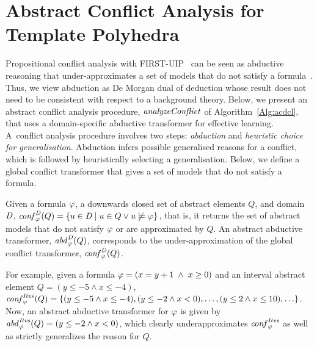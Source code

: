 \section{Abstract Conflict Analysis for Template Polyhedra}\label{sec:conflict}

Propositional conflict analysis with FIRST-UIP~\cite{cdcl} can be seen as
abductive reasoning that under-approximates a set of models that do not
satisfy a formula~\cite{sas12,dhk2013-popl}.  Thus, we view abduction as 
De Morgan dual of deduction whose result does not need to be consistent with respect
to a background theory.  Below, we present an abstract
conflict analysis procedure, $\mathit{analyzeConflict}$ of
Algorithm~\ref{Alg:acdcl}, that uses a domain-specific abductive transformer
for effective learning.  A~conflict analysis procedure involves two steps:
{\em abduction} and {\em heuristic choice for generalisation}.  Abduction
infers possible generalised reasons for a conflict, which is followed by
heuristically selecting a generalisation.  Below, we define a global 
conflict transformer that gives a set of models that do not satisfy a 
formula.
%
\begin{definition}
  Given a formula $\varphi$, a downwards closed set of abstract elements $Q$,
  and domain $\mathit{D}$, $\mathit{conf}_{\varphi}^{\mathit{D}}(Q) = \{u \in \mathit{D} \mid u \in
  Q \vee u \not\models \varphi \}$, that is, it returns 
  the set of abstract models that do not satisfy $\varphi$ or are approximated by 
  $Q$.  An abstract abductive transformer, $\mathit{abd}_{\varphi}^{\mathit{D}}(Q)$, corresponds to 
  the under-approximation of the global conflict transformer,
  $\mathit{conf}_{\varphi}^{\mathit{D}}(Q)$.  
\end{definition}
%
%
For example, given a formula $\varphi=(x=y+1\; \wedge\; x\geq 0)$ and an interval 
abstract element $Q=(y\leq-5 \wedge x \leq -4)$, 
$\conf{\formula}{\intervals}(Q) = \{(y\leq-5 \land x \leq -4),\linebreak 
(y \leq -2 \land x < 0), \ldots, (y \leq 2 \land x \leq 10), \ldots \}$.  
%
Now, an abstract abductive transformer for $\varphi$ 
is given by $\mathit{abd}_{\varphi}^{\mathit{Itvs}}(Q)=(y \leq -2 \land x < 0)$, 
which clearly underapproximates $\mathit{conf}_{\varphi}^{\mathit{Itvs}}$ as well as 
strictly generalizes the reason for $Q$. 
%

